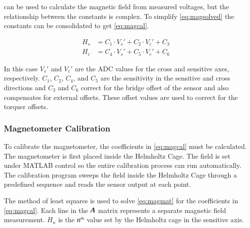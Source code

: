  can be used to calculate the magnetic field from measured voltages, but the relationship between the constants is complex. To simplify \cref{eq:magsolved} the constants can be consolidated to get \cref{eq:magcal}.

\begin{equation}
    \label{eq:magcal}
    \begin{split}
        H_s &= C_1 \cdot V_s' + C_2 \cdot V_c' + C_3\\
        H_c &= C_4 \cdot V_s' + C_5 \cdot V_c' + C_6
    \end{split}
\end{equation}

In this case $V_s'$ and $V_c'$ are the \ac{ADC} values for the cross and sensitive axes, respectively. $C_1$, $C_2$, $C_4$, and $C_5$ are the sensitivity in the sensitive and cross directions and $C_3$ and $C_6$ correct for the bridge offset of the sensor and also compensates for external offsets. These offset values are used to correct for the torquer offsets.

\subsubsection{Magnetometer Calibration}
\label{sec:magcal}

To calibrate the magnetometer, the coefficients in \cref{eq:magcal} must be calculated. The magnetometer is first placed inside the Helmholtz Cage. The field is set under MATLAB control so the entire calibration process can run automatically. The calibration program sweeps the field inside the Helmholtz Cage through a predefined sequence and reads the sensor output at each point. 

The method of least squares is used to solve \cref{eq:magmat} for the coefficients in \cref{eq:magcal}. Each line in the $\boldsymbol{A}$ matrix represents a separate magnetic field measurement. $H_n$ is the $n^{\text{\tiny th}}$ value set by the Helmholtz cage in the sensitive axis. 

